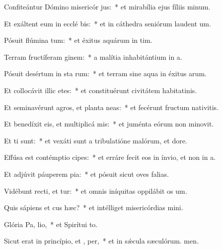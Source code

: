 \item Confiteántur Dómino misericór jus:~* et mirabília ejus fíliis minum.
\item Et exáltent eum in ecclé bis:~* et in cáthedra seniórum laudent um.
\item Pósuit flúmina  tum:~* et éxitus aquárum in tim.
\item Terram fructíferam  ginem:~* a malítia inhabitántium in a.
\item Pósuit desértum in sta rum:~* et terram sine aqua in éxitus arum.
\item Et collocávit illic etes:~* et constituérunt civitátem habitatinis.
\item Et seminavérunt agros, et planta neas:~* et fecérunt fructum nativitis.
\item Et benedíxit eis, et multiplicá  mis:~* et juménta eórum non minovit.
\item Et  ti sunt:~* et vexáti sunt a tribulatióne malórum, et dore.
\item Effúsa est contémptio  cipes:~* et erráre fecit eos in ínvio, et non in a.
\item Et adjúvit páuperem  pia:~* et pósuit sicut oves falias.
\item Vidébunt recti, et tur:~* et omnis iníquitas oppilábit os um.
\item Quis sápiens et cus hæc?~* et intélliget misericórdias mini.
\item Glória Pa,  lio,~* et Spirítui to.
\item Sicut erat in princípio, et ,  per,~* et in sǽcula sæculórum. men.
